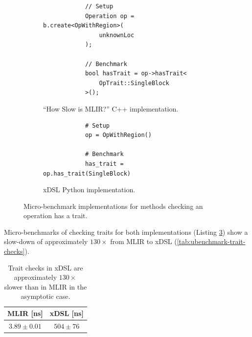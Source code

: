 \begin{figure}[H]
    \centering
    \begin{subfigure}[b]{0.45\textwidth}
       \centering
        \begin{verbatim}
            // Setup
            Operation op = b.create<OpWithRegion>(
                unknownLoc
            );
            
            // Benchmark
            bool hasTrait = op->hasTrait<
                OpTrait::SingleBlock
            >();
        \end{verbatim}
        \caption{``How Slow is MLIR?'' C++ implementation.}
        \label{listing:ubenchmark-trait-checks-bench-mlir}
    \end{subfigure}
    \hfill
    \begin{subfigure}[b]{0.45\textwidth}
        \centering
        \begin{verbatim}
            # Setup
            op = OpWithRegion()
            
            # Benchmark
            has_trait = op.has_trait(SingleBlock)
        \end{verbatim}
        \footnotesize\vspace{2em}
        \caption{xDSL Python implementation.}
        \label{listing:ubenchmark-trait-checks-bench-xdsl}
    \end{subfigure}
    \vspace{1em}
    \captionsetup{name=Listing}
    \caption{Micro-benchmark implementations for methods checking an operation has a trait.}
    \label{listing:ubenchmark-trait-checks-bench}
\end{figure}

Micro-benchmarks of checking traits for both implementations (Listing \ref{listing:ubenchmark-trait-checks-bench}) show a slow-down of approximately $130\times$ from MLIR to xDSL (\autoref{tab:ubenchmark-trait-checks}).

\begin{table}[H]
  \caption{Trait checks in xDSL are approximately $130\times$ slower than in MLIR in the asymptotic case.} %
  \label{tab:ubenchmark-trait-checks}
  \centering
  \begin{tabular}{cc}
    \toprule
    \textbf{MLIR [ns]} & \textbf{xDSL [ns]}\\
    \midrule
    $3.89 \pm 0.01$ & $504 \pm 76$ \\
    \bottomrule
  \end{tabular}
\end{table}


